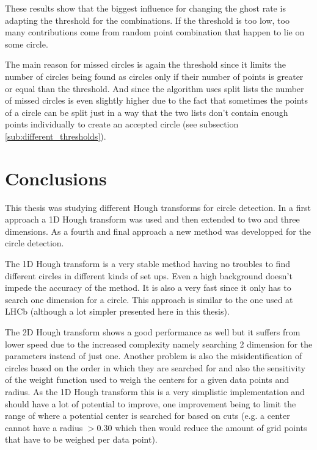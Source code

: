 \documentclass[11pt,twoside]{scrreprt}
\begin{document}
These results show that the biggest influence for changing the ghost rate is adapting the
threshold for the combinations. If the threshold is too low, too many contributions come from
random point combination that happen to lie on some circle.

The main reason for missed circles is again the threshold since it limits the number of circles
being found as circles only if their number of points is greater or equal than the threshold. And
since the algorithm uses split lists the number of missed circles is even slightly higher due to the
fact that sometimes the points of a circle can be split just in a way that the two lists don't
contain enough points individually to create an accepted circle (see subsection \ref{sub:different_thresholds}).




\chapter{Conclusions} %
\label{cha:conclusions}

This thesis was studying different Hough transforms for circle detection. In a first approach a 1D Hough transform was used and then extended to two and three
dimensions.
As a fourth and final approach a new method was developped for the circle detection. 

The 1D Hough transform is a very stable method having no troubles to find different circles in different kinds of set ups. Even a high background
doesn't impede the accuracy of the method. It is also a very fast since it only has to search one dimension for a circle.
This approach is similar to the one used at LHCb (although a lot simpler presented here in this thesis).

The 2D Hough transform shows a good performance as well but it suffers from lower speed due to the increased complexity namely searching
2 dimension for the parameters instead of just one. Another problem is also the misidentification of circles based on the order in which
they are searched for and also the sensitivity of the weight function used to weigh the centers for a given data points and radius.
As the 1D Hough transform this is a very simplistic implementation and should have a lot of potential to improve, one improvement being to
limit the range of where a potential center is searched for based on cuts (e.g. a center cannot have a radius $>0.30$ which then would reduce
the amount of grid points that have to be weighed per data point).
\end{document}
